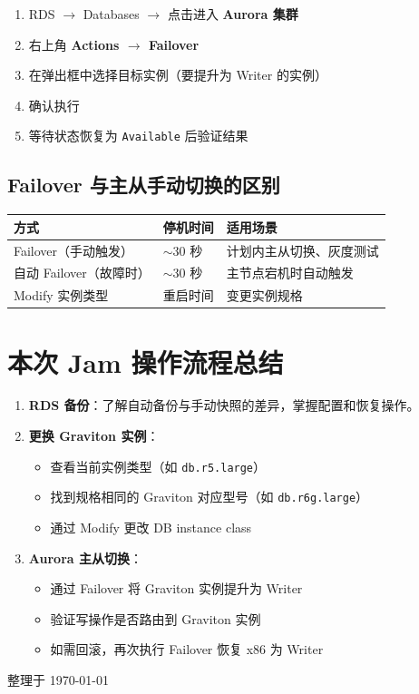 \documentclass[12pt, a4paper]{article}
\begin{document}
\begin{enumerate}[leftmargin=2em]
  \item RDS $\to$ Databases $\to$ 点击进入 \textbf{Aurora 集群}
  \item 右上角 \textbf{Actions $\to$ Failover}
  \item 在弹出框中选择目标实例（要提升为 Writer 的实例）
  \item 确认执行
  \item 等待状态恢复为 \texttt{Available} 后验证结果
\end{enumerate}

\subsection{Failover 与主从手动切换的区别}

\begin{center}
\begin{tabular}{lll}
\toprule
\textbf{方式} & \textbf{停机时间} & \textbf{适用场景} \\
\midrule
Failover（手动触发）   & $\sim$30 秒 & 计划内主从切换、灰度测试 \\
自动 Failover（故障时）& $\sim$30 秒 & 主节点宕机时自动触发 \\
Modify 实例类型        & 重启时间    & 变更实例规格 \\
\bottomrule
\end{tabular}
\end{center}

\section{本次 Jam 操作流程总结}

\begin{enumerate}[leftmargin=2em, label=\textbf{Task \arabic*.}]
  \item \textbf{RDS 备份}：了解自动备份与手动快照的差异，掌握配置和恢复操作。

  \item \textbf{更换 Graviton 实例}：
  \begin{itemize}
    \item 查看当前实例类型（如 \texttt{db.r5.large}）
    \item 找到规格相同的 Graviton 对应型号（如 \texttt{db.r6g.large}）
    \item 通过 Modify 更改 DB instance class
  \end{itemize}

  \item \textbf{Aurora 主从切换}：
  \begin{itemize}
    \item 通过 Failover 将 Graviton 实例提升为 Writer
    \item 验证写操作是否路由到 Graviton 实例
    \item 如需回滚，再次执行 Failover 恢复 x86 为 Writer
  \end{itemize}
\end{enumerate}

\vspace{2em}
\begin{center}
  \color{gray}\small 整理于 \today
\end{center}
\end{document}
